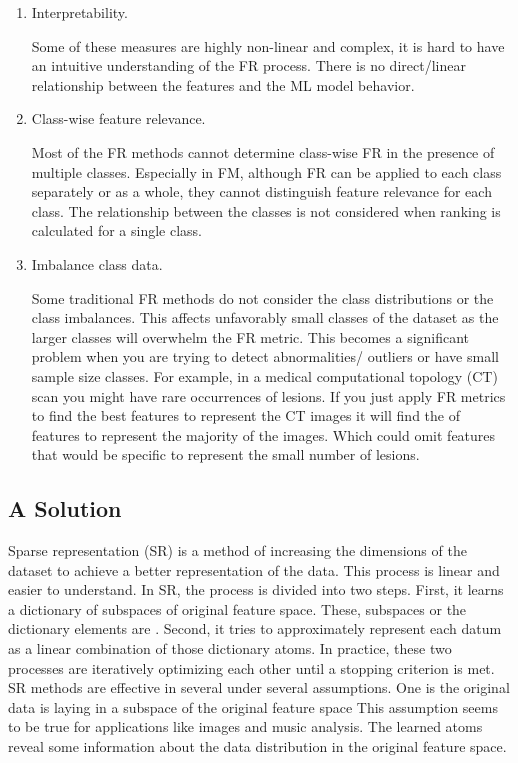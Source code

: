 \begin{enumerate}
    \item Interpretability.
    
    Some of these measures are highly non-linear and complex, it is hard to have an intuitive understanding of the FR process. There is no direct/linear relationship between the features and the ML model behavior.
    
    \item Class-wise feature relevance.
    
    Most of the FR methods cannot determine class-wise FR in the presence of multiple classes. Especially in FM, although FR can be applied to each class separately or as a whole, they cannot distinguish feature relevance for each class. The relationship between the classes is not considered when ranking is calculated for a single class.
    
    \item Imbalance class data.
    
    Some traditional FR methods do not consider the class distributions or the class imbalances. This affects unfavorably small classes of the dataset as the larger classes will overwhelm the FR metric. This becomes a significant problem when you are trying to detect abnormalities/ outliers or have small sample size classes. For example, in a medical computational topology (CT) scan you might have rare occurrences of lesions. If you just apply FR metrics to find the best features to represent the CT images it will find the  of features to represent the majority of the images. Which could omit features that would be specific to represent the small number of lesions.  
\end{enumerate}

\subsection{A Solution}

Sparse representation (SR) is a method of increasing the dimensions of the dataset to achieve a better representation of the data\cite{Elad2010}. This process is linear and easier to understand. In SR, the process is divided into two steps. First, it learns a dictionary of subspaces of original feature space. These, subspaces or the dictionary elements are . Second, it tries to approximately represent each datum as a linear combination of those dictionary atoms. In practice, these two processes are iteratively optimizing each other until a stopping criterion is met. SR methods are effective in several under several assumptions. One is the original data is laying in a subspace of the original feature space This assumption seems to be true for applications like images and music analysis. The learned atoms reveal some information about the data distribution in the original feature space. 

